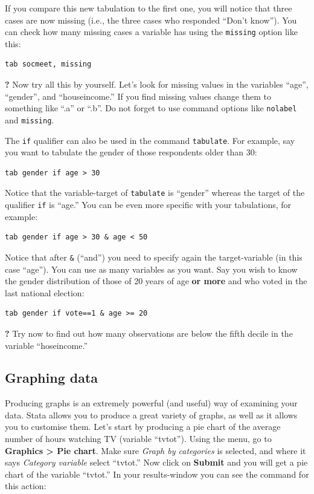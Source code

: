 \documentclass{article}
\newcommand{\forceindent}{\leavevmode{\parindent=2em\indent}}
\begin{document}
If you compare this new tabulation to the first one, you will notice that three cases are now missing (i.e., the three cases who responded ``Don't know''). You can check how many missing cases a variable has using the \texttt{missing} option like this:

\begin{lstlisting}
tab socmeet, missing
\end{lstlisting}  

\forceindent \textbf{?} Now try all this by yourself. Let's look for missing values in the variables ``age'', ``gender'', and ``houseincome.'' If you find missing values change them to something like ``.a'' or ``.b''. Do not forget to use command options like \texttt{nolabel} and \texttt{missing}.

The \texttt{if} qualifier can also be used in the command \texttt{tabulate}. For example, say you want to tabulate the gender of those respondents older than 30:

\begin{lstlisting}
tab gender if age > 30
\end{lstlisting}

Notice that the variable-target of \texttt{tabulate} is ``gender'' whereas the target of the qualifier \texttt{if} is ``age.'' You can be even more specific with your tabulations, for example:

\begin{lstlisting}
tab gender if age > 30 & age < 50
\end{lstlisting}

Notice that after \texttt{\&} (``and'') you need to specify again the target-variable (in this case ``age''). You can use as many variables as you want. Say you wish to know the gender distribution of those of 20 years of age \textbf{or more} and who voted in the last national election:

\begin{lstlisting}
tab gender if vote==1 & age >= 20
\end{lstlisting}

\forceindent \textbf{?} Try now to find out how many observations are below the fifth decile in the variable ``hoseincome.''

\subsection*{Graphing data}

Producing graphs is an extremely powerful (and useful) way of examining your data. Stata allows you to produce a great variety of graphs, as well as it allows you to customise them. Let's start by producing a pie chart of the average number of hours watching TV (variable ``tvtot''). Using the menu, go to \textbf{Graphics > Pie chart}. Make sure \textit{Graph by categories} is selected, and where it says \textit{Category variable} select ``tvtot.'' Now click on \textbf{Submit} and you will get a pie chart of the variable ``tvtot.'' In your results-window you can see the command for this action:
\end{document}
